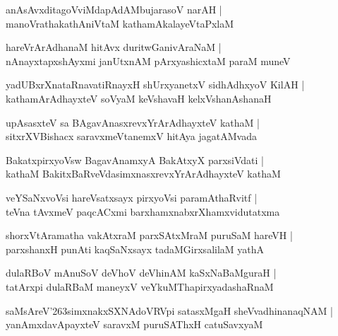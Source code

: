 \documentclass[twoside,12pt,openright]{book}
\def\S{\char'263}
\newcounter{shloka}[chapter]
\begin{document}
\begin{shloka}%
anAsAvxditagoVviMdapAdAMbujarasoV narAH |\\
manoVrathakathAniVtaM kathamAkalayeVtaPxlaM 
\end{shloka}

\begin{shloka}%
hareVrArAdhanaM hitAvx duritwGanivAraNaM |\\
nAnayxtapxshAyxmi janUtxnAM pArxyashicxtaM paraM muneV 
\end{shloka}

\begin{shloka}%
yadUBxrXnataRnavatiRnayxH shUrxyanetxV sidhAdhxyoV KilAH |\\
kathamArAdhayxteV soVyaM keVshavaH kelxVshanAshanaH 
\end{shloka}

\begin{shloka}%
upAsasxteV sa BAgavAnasxrevxYrArAdhayxteV kathaM |\\
sitxrXVBishacx saravxmeVtanemxV hitAya jagatAMvada
\end{shloka}

\begin{shloka}%
BakatxpirxyoVsw BagavAnamxyA BakAtxyX parxsiVdati |\\
kathaM BakitxBaRveVdasimxnasxrevxYrArAdhayxteV kathaM 
\end{shloka}

\begin{shloka}%
veYSaNxvoVsi hareVsatxsayx pirxyoVsi paramAthaRvitf |\\
teVna tAvxmeV paqcACxmi barxhamxnabxrXhamxvidutatxma
\end{shloka}

\begin{shloka}%
shorxVtAramatha vakAtxraM parxSAtxMraM puruSaM hareVH |\\
parxshanxH punAti kaqSaNxsayx tadaMGirxsalilaM yathA 
\end{shloka}

\begin{shloka}%
dulaRBoV mAnuSoV deVhoV deVhinAM kaSxNaBaMguraH |\\
tatArxpi dulaRBaM maneyxV veYkuMThapirxyadashaRnaM 
\end{shloka}

\begin{shloka}%
saMsAreV\S simxnakxSXNAdoVRVpi satasxMgaH sheVvadhinanaqNAM |\\
yanAmxdavApayxteV saravxM puruSAThxH catuSavxyaM 
\end{shloka}
\end{document}
